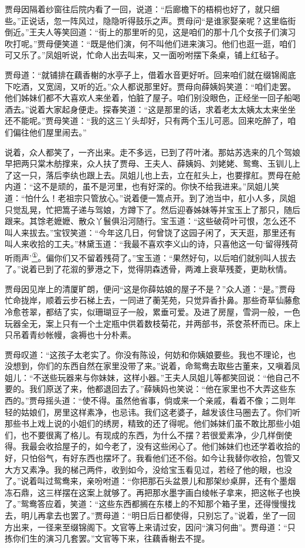 贾母因隔着纱窗往后院内看了一回，说道：``后廊檐下的梧桐也好了，就只细些。''正说话，忽一阵风过，隐隐听得鼓乐之声。贾母问``是谁家娶亲呢？这里临街倒近。''王夫人等笑回道：``街上的那里听的见，这是咱们的那十几个女孩子们演习吹打呢。''贾母便笑道：``既是他们演，何不叫他们进来演习。他们也逛一逛，咱们可又乐了。''凤姐听说，忙命人出去叫来，又一面吩咐摆下条桌，铺上红毡子。

贾母道：``就铺排在藕香榭的水亭子上，借着水音更好听。回来咱们就在缀锦阁底下吃酒，又宽阔，又听的近。''众人都说那里好。贾母向薛姨妈笑道：``咱们走罢。他们姊妹们都不大喜欢人来坐着，怕脏了屋子。咱们别没眼色，正经坐一回子船喝酒去。''说着大家起身便走。探春笑道：``这是那里的话，求着老太太姨太太来坐坐还不能呢。''贾母笑道：``我的这三丫头却好，只有两个玉儿可恶。回来吃醉了，咱们偏往他们屋里闹去。''

说着，众人都笑了，一齐出来。走不多远，已到了荇叶渚。那姑苏选来的几个驾娘早把两只棠木舫撑来，众人扶了贾母、王夫人、薛姨妈、刘姥姥、鸳鸯、玉钏儿上了这一只，落后李纨也跟上去。凤姐儿也上去，立在舡头上，也要撑舡。贾母在舱内道：``这不是顽的，虽不是河里，也有好深的。你快不给我进来。''凤姐儿笑道：``怕什么！老祖宗只管放心。''说着便一篙点开。到了池当中，舡小人多，凤姐只觉乱晃，忙把篙子递与驾娘，方蹲下了。然后迎春姊妹等并宝玉上了那只，随后跟来。其馀老嬷嬷、散众丫鬟俱沿河随行。宝玉道：``这些破荷叶可恨，怎么还不叫人来拔去。''宝钗笑道：``今年这几日，何曾饶了这园子闲了，天天逛，那里还有叫人来收拾的工夫。''林黛玉道：``我最不喜欢李义山的诗，只喜他这一句`留得残荷听雨声'\href{../Text/part0044_split_000.html\#lnkback_1_a}{\textsuperscript{①}}。偏你们又不留着残荷了。''宝玉道：``果然好句，以后咱们就别叫人拔去了。''说着已到了花溆的萝港之下，觉得阴森透骨，两滩上衰草残菱，更助秋情。

贾母因见岸上的清厦旷朗，便问``这是你薛姑娘的屋子不是？''众人道：``是。''贾母忙命拢岸，顺着云步石梯上去，一同进了蘅芜苑，只觉异香扑鼻。那些奇草仙藤愈冷愈苍翠，都结了实，似珊瑚豆子一般，累垂可爱。及进了房屋，雪洞一般，一色玩器全无，案上只有一个土定瓶中供着数枝菊花，并两部书，茶奁茶杯而已。床上只吊着青纱帐幔，衾褥也十分朴素。

贾母叹道：``这孩子太老实了。你没有陈设，何妨和你姨娘要些。我也不理论，也没想到，你们的东西自然在家里没带了来。''说着，命鸳鸯去取些古董来，又嗔着凤姐儿：``不送些玩器来与你妹妹，这样小器。''王夫人凤姐儿等都笑回说：``他自己不要的。我们原送了来，他都退回去了。''薛姨妈也笑说：``他在家里也不大弄这些东西的。''贾母摇头道：``使不得。虽然他省事，倘或来一个亲戚，看着不像；二则年轻的姑娘们，房里这样素净，也忌讳。我们这老婆子，越发该住马圈去了。你们听那些书上戏上说的小姐们的绣房，精致的还了得呢。他们姊妹们虽不敢比那些小姐们，也不要很离了格儿。有现成的东西，为什么不摆？若很爱素净，少几样倒使得。我最会收拾屋子的，如今老了，没有这些闲心了。他们姊妹们也还学着收拾的好，只怕俗气，有好东西也摆坏了。我看他们还不俗。如今让我替你收拾，包管又大方又素净。我的梯己两件，收到如今，没给宝玉看见过，若经了他的眼，也没了。''说着叫过鸳鸯来，亲吩咐道：``你把那石头盆景儿和那架纱桌屏，还有个墨烟冻石鼎，这三样摆在这案上就够了。再把那水墨字画白绫帐子拿来，把这帐子也换了。''鸳鸯答应着，笑道：``这些东西都搁在东楼上的不知那个箱子里，还得慢慢找去，明儿再拿去也罢了。''贾母道：``明日后日都使得，只别忘了。''说着，坐了一回方出来，一径来至缀锦阁下。文官等上来请过安，因问``演习何曲''。贾母道：``只拣你们生的演习几套罢。''文官等下来，往藕香榭去不提。

